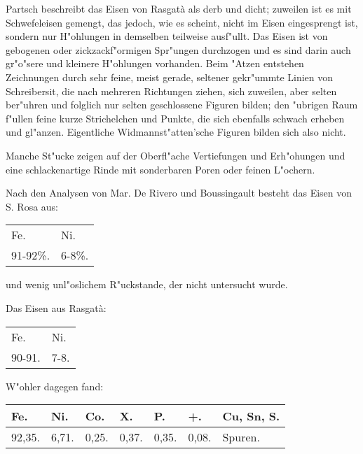 \documentclass[a4paper, 11pt, oneside]{article}
\begin{document}
Partsch beschreibt das Eisen von Rasgatà als derb und dicht; zuweilen ist es mit Schwefeleisen gemengt, das jedoch, wie es scheint, nicht im Eisen eingesprengt ist, sondern nur H"ohlungen in demselben teilweise ausf"ullt. Das Eisen ist von gebogenen oder zickzackf"ormigen Spr"ungen durchzogen und es sind darin auch gr"o"sere und kleinere H"ohlungen vorhanden. Beim "Atzen entstehen Zeichnungen durch sehr feine, meist gerade, seltener gekr"ummte Linien von Schreibersit, die nach mehreren Richtungen ziehen, sich zuweilen, aber selten ber"uhren und folglich nur selten geschlossene Figuren bilden; den "ubrigen Raum f"ullen feine kurze Strichelchen und Punkte, die sich ebenfalls schwach erheben und gl"anzen. Eigentliche Widmannst"atten'sche Figuren bilden sich also nicht.

Manche St"ucke zeigen auf der Oberfl"ache Vertiefungen und Erh"ohungen und eine schlackenartige Rinde mit sonderbaren Poren oder feinen L"ochern.

Nach den Analysen von Mar. De Rivero und Boussingault besteht das Eisen von S. Rosa aus:
\begin{table}[H]
    \centering\swabfamily\Large
    \begin{tabular}{l l}
        Fe. & Ni. \\
        91-92\%. & 6-8\%. \\
    \end{tabular}
\end{table}

und wenig unl"oslichem R"uckstande, der nicht untersucht wurde.

Das Eisen aus Rasgatà:  
\begin{table}[H]
    \centering\swabfamily\Large
    \begin{tabular}{l l}
        Fe. & Ni. \\
        90-91. & 7-8. \\
    \end{tabular}
\end{table}

W"ohler dagegen fand:
\begin{table}[H]
    \centering\swabfamily\Large
    \begin{tabular}{l l l l l l l}
        Fe. & Ni. & Co. & X. & P. & +. & Cu, Sn, S.  \\ \hline
        92,35. & 6,71. & 0,25. & 0,37. & 0,35. & 0,08. & Spuren. \\
    \end{tabular}
\end{table}
\end{document}
